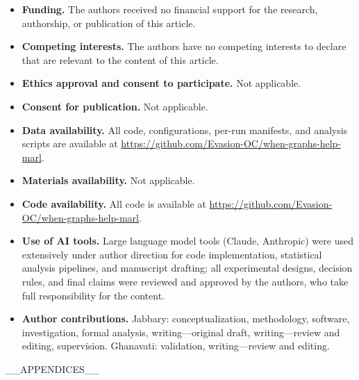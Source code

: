 \begin{itemize}
\item \textbf{Funding.} The authors received no financial support for the research, authorship, or publication of this article.
\item \textbf{Competing interests.} The authors have no competing interests to declare that are relevant to the content of this article.
\item \textbf{Ethics approval and consent to participate.} Not applicable.
\item \textbf{Consent for publication.} Not applicable.
\item \textbf{Data availability.} All code, configurations, per-run manifests, and analysis scripts are available at \url{https://github.com/Evasion-OC/when-graphs-help-marl}.
\item \textbf{Materials availability.} Not applicable.
\item \textbf{Code availability.} All code is available at \url{https://github.com/Evasion-OC/when-graphs-help-marl}.
\item \textbf{Use of AI tools.} Large language model tools (Claude, Anthropic) were used extensively under author direction for code implementation, statistical analysis pipelines, and manuscript drafting; all experimental designs, decision rules, and final claims were reviewed and approved by the authors, who take full responsibility for the content.
\item \textbf{Author contributions.} Jabbary: conceptualization, methodology, software, investigation, formal analysis, writing---original draft, writing---review and editing, supervision. Ghanavati: validation, writing---review and editing.
\end{itemize}



\begin{appendices}
__APPENDICES__
\end{appendices}


